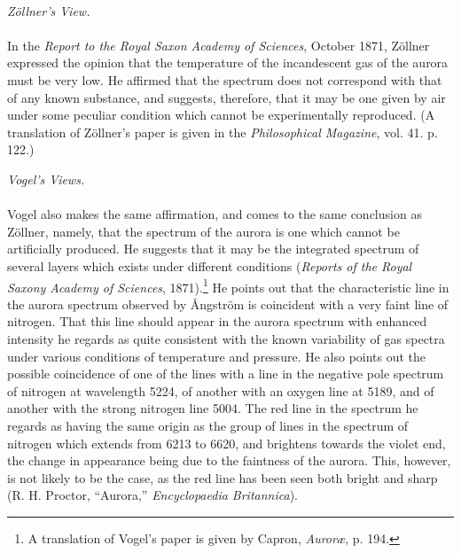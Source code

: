 \documentclass[a4paper, 12pt, oneside, polutonikogreek, english]{article}
\begin{document}
\paragraph{}
\begin{center}
\emph{Zöllner's View.}
\end{center}
\paragraph{}
In the \emph{Report to the Royal Saxon Academy of Sciences}, October 1871, Zöllner expressed the opinion that the temperature of the incandescent gas of the aurora must be very low. He affirmed that the spectrum does not correspond with that of any known substance, and suggests, therefore, that it may be one given by air under some peculiar condition which cannot be experimentally reproduced. (A translation of Zöllner's paper is given in the \emph{Philosophical Magazine}, vol. 41. p. 122.)
\begin{center}
\emph{Vogel's Views.}
\end{center}
\paragraph{}
Vogel also makes the same affirmation, and comes to the same conclusion as Zöllner, namely, that the spectrum of the aurora is one which cannot be artificially produced. He suggests that it may be the integrated spectrum of several layers which exists under different conditions (\emph{Reports of the Royal Saxony Academy of Sciences}, 1871).\footnote{A translation of Vogel's paper is given by Capron, \emph{Auroræ}, p. 194.} He points out that the characteristic line in the aurora spectrum observed by Ångström is coincident with a very faint line of nitrogen. That this line should appear in the aurora spectrum with enhanced intensity he regards as quite consistent with the known variability of gas spectra under various conditions of temperature and pressure. He also points out the possible coincidence of one of the lines with a line in the negative pole spectrum of nitrogen at wavelength 5224, of another with an oxygen line at 5189, and of another with the strong nitrogen line 5004. The red line in the spectrum he regards as having the same origin as the group of lines in the spectrum of nitrogen which extends from 6213 to 6620, and brightens towards the violet end, the change in appearance being due to the faintness of the aurora. This, however, is not likely to be the case, as the red line has been seen both bright and sharp (R. H. Proctor, ``Aurora,'' \emph{Encyclopaedia Britannica}).
\end{document}
